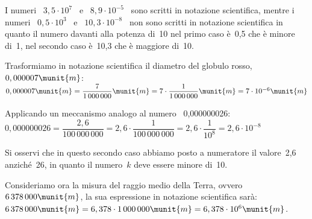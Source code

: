 \begin{esempio}{}{}
I numeri~ \(3,5\cdot10^7\)~ e ~\(8,9\cdot10^{-5}\)~ sono scritti in 
notazione scientifica, mentre i numeri~ \(0,5\cdot10^3\)~ 
e ~\(10,3\cdot 10^{-8}\)~ non sono scritti in notazione scientifica in 
quanto il numero davanti alla potenza di~10 nel primo caso è~0,5 che è 
minore di~1, nel secondo caso è~10,3 che è maggiore di~10.
\end{esempio}

Trasformiamo in notazione scientifica il diametro del globulo rosso, 
~\(0,000007\munit{m}\): \\
\(0,000007\munit{m}=\dfrac{7}{1\,000\,000}\munit{m}=
  7\cdot\dfrac{1}{1\,000\,000}\munit{m}=
  7\cdot10^{-6}\munit{m}\)

\vspace{.5em}
Applicando un meccanismo analogo al numero ~0,000000026: \\ 
\(0,000000026=\dfrac{2,6}{100\,000\,000}=
  2,6\cdot\dfrac{1}{100\,000\,000}=
  2,6\cdot\dfrac{1}{10^8}=2,6\cdot10^{-8}\)

Si osservi che in questo secondo caso abbiamo posto a numeratore il 
valore~2,6 anziché~26, in quanto il numero~\(k\) deve essere minore di~10.

Consideriamo ora la misura del raggio medio della Terra, 
ovvero~\(6\,378\,000\munit{m}\),
la sua espressione in notazione scientifica sarà: \\ 
\(6\,378\,000\munit{m} = 6,378\cdot1\,000\,000\munit{m} = 
6,378\cdot10^6\munit{m}\).


{\notesp}


